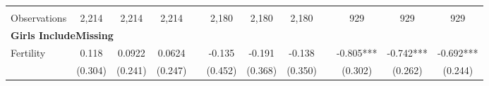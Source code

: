 \begin{landscape}
\begin{table}[htpb!]
\begin{center}
\begin{tabular}{lcccp{2mm}cccp{2mm}ccc}
\begin{footnotesize}\end{footnotesize}&\begin{footnotesize}\end{footnotesize}&\begin{footnotesize}\end{footnotesize}&\begin{footnotesize}\end{footnotesize}&\begin{footnotesize}\end{footnotesize}&\begin{footnotesize}\end{footnotesize}&\begin{footnotesize}\end{footnotesize}&\begin{footnotesize}\end{footnotesize}&\begin{footnotesize}\end{footnotesize}&\begin{footnotesize}\end{footnotesize}&\begin{footnotesize}\end{footnotesize}&\begin{footnotesize}\end{footnotesize}\\Observations&2,214&2,214&2,214&&2,180&2,180&2,180&&929&929&929\\
\multicolumn{12}{l}{\textbf{Girls IncludeMissing}}\\ 
Fertility&0.118&0.0922&0.0624&&-0.135&-0.191&-0.138&&-0.805***&-0.742***&-0.692***\\
&(0.304)&(0.241)&(0.247)&&(0.452)&(0.368)&(0.350)&&(0.302)&(0.262)&(0.244)\\

\end{tabular}
\end{center}
\end{table}
\end{landscape}
